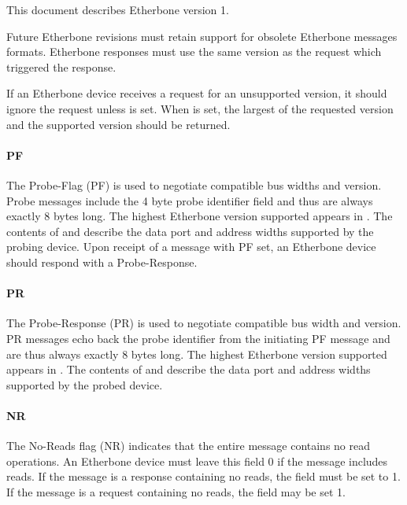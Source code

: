 \documentclass{article}
\begin{document}
This document describes Etherbone version 1.

Future Etherbone revisions must retain support for obsolete
Etherbone messages formats.
Etherbone responses must use the same version as the request
which triggered the response.

If an Etherbone device receives a request for an unsupported version,
it should ignore the request unless  is set.
When  is set, the largest of the requested version
and the supported version should be returned.

\paragraph{PF} \label{field:PF}

The Probe-Flag (PF) is used to negotiate compatible bus widths and version.
Probe messages include the 4 byte probe identifier field
and thus are always exactly 8 bytes long.
The highest Etherbone version supported appears in .
The contents of  and  
describe the data port and address widths supported by the probing device.
Upon receipt of a message with PF set, 
an Etherbone device should respond with a Probe-Response.

\paragraph{PR} \label{field:PR}

The Probe-Response (PR) is used to negotiate compatible bus width and version.
PR messages echo back the probe identifier from the initiating PF message
and are thus always exactly 8 bytes long.
The highest Etherbone version supported appears in .
The contents of  and  
describe the data port and address widths supported by the probed device.

\paragraph{NR} \label{field:NR}

The No-Reads flag (NR) indicates that the entire message 
contains no read operations.
An Etherbone device must leave this field 0 if the message includes reads.
If the message is a response containing no reads,
the field must be set to 1.
If the message is a request containing no reads,
the field may be set 1.
\end{document}
